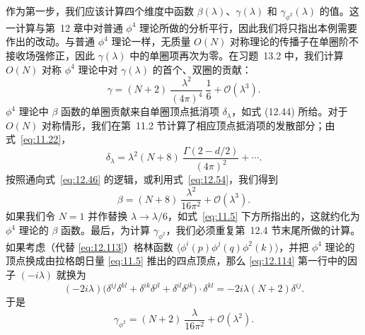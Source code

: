 作为第一步，我们应该计算四个维度中函数 $\beta(\lambda)$、$\gamma(\lambda)$ 和 $\gamma_{\phi^2}(\lambda)$ 的值。这一计算与第~12 章中对普通 $\phi^4$ 理论所做的分析平行，因此我们将只指出本例需要作出的改动。与普通 $\phi^4$ 理论一样，无质量 $O(N)$ 对称理论的传播子在单圈阶不接收场强修正，因此 $\gamma(\lambda)$ 中的单圈项再次为零。在习题~13.2 中，我们计算 $O(N)$ 对称 $\phi^4$ 理论中对 $\gamma(\lambda)$ 的首个、双圈的贡献：
\begin{equation}
  \gamma = (N+2)\ \frac{\lambda^2}{(4\pi)^4}\ \frac{1}{6}
    + \mathcal{O}(\lambda^3) .
  \label{eq:13.47}
\end{equation}
$\phi^4$ 理论中 $\beta$ 函数的单圈贡献来自单圈顶点抵消项 $\delta_\lambda$，如式 (12.44) 所给。对于 $O(N)$ 对称情形，我们在第~11.2 节计算了相应顶点抵消项的发散部分；由式~\eqref{eq:11.22}，
\begin{equation}
  \delta_\lambda = \lambda^2(N+8)\ \frac{\Gamma(2-d/2)}{(4\pi)^2}
    + \cdots .
  \label{eq:13.48}
\end{equation}
按照通向式~\eqref{eq:12.46} 的逻辑，或利用式~\eqref{eq:12.54}，我们得到
\begin{equation}
  \beta = (N+8)\ \frac{\lambda^2}{16\pi^2} + \mathcal{O}(\lambda^3) .
  \label{eq:13.49}
\end{equation}
如果我们令 $N = 1$ 并作替换 $\lambda\to\lambda/6$，如式~\eqref{eq:11.5} 下方所指出的，这就约化为 $\phi^4$ 理论的 $\beta$ 函数。最后，为计算 $\gamma_{\phi^2}$，我们必须重复第~12.4 节末尾所做的计算。如果考虑（代替 \eqref{eq:12.113}）格林函数 $\langle\phi^i(p)\phi^j(q)\phi^2(k)\rangle$，并把 $\phi^4$ 理论的顶点换成由拉格朗日量 \eqref{eq:11.5} 推出的四点顶点，那么 \eqref{eq:12.114} 第一行中的因子 $(-i\lambda)$ 就换为
\begin{equation}
  (-2i\lambda)\bigl( \delta^{ij}\delta^{kl} + \delta^{ik}\delta^{jl}
    + \delta^{il}\delta^{jk} \bigr)\cdot\delta^{kl}
  = -2i\lambda(N+2)\delta^{ij} .
\end{equation}
于是
\begin{equation}
  \gamma_{\phi^2} = (N+2)\ \frac{\lambda}{16\pi^2} + \mathcal{O}(\lambda^2) .
  \label{eq:13.50}
\end{equation}

